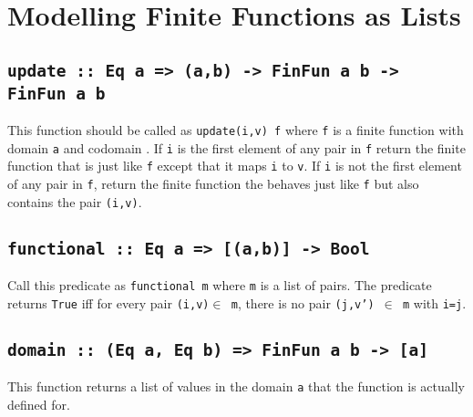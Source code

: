 \documentclass[11pt]{article}
\begin{document}

\section{Modelling Finite Functions as Lists}



\subsection{{\tt{update :: Eq a => (a,b) -> FinFun a b -> FinFun a b}}}

This function should be called as {\tt{update(i,v) f}} where {\tt{f}}
is a finite function with domain {\tt{a}} and codomain {}.  If
{\tt{i}} is the first element of any pair in {\tt{f}} return the
finite function that is just like {\tt{f}} except that it maps
{\tt{i}} to {\tt{v}}.  If {\tt{i}} is not the first element of any
pair in {\tt{f}}, return the finite function the behaves just like
{\tt{f}} but also contains the pair {\tt(i,v)}.

\subsection{\tt{{functional :: Eq a => [(a,b)] -> Bool}}}
Call this predicate as {\tt{functional m}} where {\tt{m}} is a list of pairs.
The predicate returns {\tt{True}} iff for every pair {\tt{(i,v)$\in$ m}}, there is no pair {\tt{(j,v') $\in$ m}} with {\tt{i=j}}.


\subsection{\tt{{domain :: (Eq a, Eq b) => FinFun a b -> [a]}}}
This function returns a list of values in the domain {\tt{a}} that the function is actually defined for.
\end{document}
